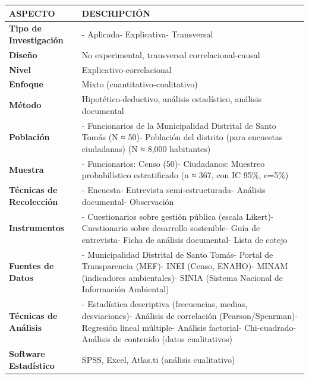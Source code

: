 \documentclass[
  man,
  floatsintext,
  longtable,
  a4paper,
  nolmodern,
  notxfonts,
  notimes,
  12pt,
  colorlinks=true,linkcolor=blue,citecolor=blue,urlcolor=blue]{apa7}
\newcounter{none} %
\begin{document}
{\def\LTcaptype{none} %
\begin{longtable}[]{@{}
  >{\raggedright\arraybackslash}p{}
  >{\raggedright\arraybackslash}p{}@{}}
\toprule\noalign{}
\begin{minipage}[b]{\linewidth}\raggedright
ASPECTO
\end{minipage} & \begin{minipage}[b]{\linewidth}\raggedright
DESCRIPCIÓN
\end{minipage} \\
\midrule\noalign{}
\endhead
\bottomrule\noalign{}
\endlastfoot
\textbf{Tipo de Investigación} & - Aplicada- Explicativa- Transversal \\
\textbf{Diseño} & No experimental, transversal correlacional-causal \\
\textbf{Nivel} & Explicativo-correlacional \\
\textbf{Enfoque} & Mixto (cuantitativo-cualitativo) \\
\textbf{Método} & Hipotético-deductivo, análisis estadístico, análisis
documental \\
\textbf{Población} & - Funcionarios de la Municipalidad Distrital de
Santo Tomás (N ≈ 50)- Población del distrito (para encuestas ciudadanas)
(N ≈ 8,000 habitantes) \\
\textbf{Muestra} & - Funcionarios: Censo (50)- Ciudadanos: Muestreo
probabilístico estratificado (n ≈ 367, con IC 95\%, e=5\%) \\
\textbf{Técnicas de Recolección} & - Encuesta- Entrevista
semi-estructurada- Análisis documental- Observación \\
\textbf{Instrumentos} & - Cuestionarios sobre gestión pública (escala
Likert)- Cuestionario sobre desarrollo sostenible- Guía de entrevista-
Ficha de análisis documental- Lista de cotejo \\
\textbf{Fuentes de Datos} & - Municipalidad Distrital de Santo Tomás-
Portal de Transparencia (MEF)- INEI (Censo, ENAHO)- MINAM (indicadores
ambientales)- SINIA (Sistema Nacional de Información Ambiental) \\
\textbf{Técnicas de Análisis} & - Estadística descriptiva (frecuencias,
medias, desviaciones)- Análisis de correlación (Pearson/Spearman)-
Regresión lineal múltiple- Análisis factorial- Chi-cuadrado- Análisis de
contenido (datos cualitativos) \\
\textbf{Software Estadístico} & SPSS, Excel, Atlas.ti (análisis
cualitativo) \\
\end{longtable}
}
\end{document}

